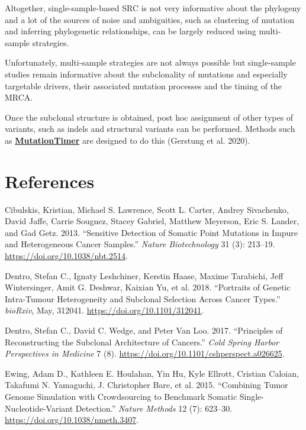 \documentclass[]{article}
\begin{document}
Altogether, single-sample-based SRC is not very informative about the
phylogeny and a lot of the sources of noise and ambiguities, such as
clustering of mutation and inferring phylogenetic relationships, can be
largely reduced using multi-sample strategies.

Unfortunately, multi-sample strategies are not always possible but
single-sample studies remain informative about the subclonality of
mutations and especially targetable drivers, their associated mutation
processes and the timing of the MRCA.

Once the subclonal structure is obtained, post hoc assignment of other
types of variants, such as indels and structural variants can be
performed. Methods such as
\href{https://github.com/gerstung-lab/MutationTimeR}{\textbf{MutationTimer}}
are designed to do this (Gerstung et al. 2020).

\newpage

\hypertarget{references}{%
\section*{References}\label{references}}

\hypertarget{refs}{}
\leavevmode\hypertarget{ref-cibulskis_sensitive_2013}{}%
Cibulskis, Kristian, Michael S. Lawrence, Scott L. Carter, Andrey
Sivachenko, David Jaffe, Carrie Sougnez, Stacey Gabriel, Matthew
Meyerson, Eric S. Lander, and Gad Getz. 2013. ``Sensitive Detection of
Somatic Point Mutations in Impure and Heterogeneous Cancer Samples.''
\emph{Nature Biotechnology} 31 (3): 213--19.
\url{https://doi.org/10.1038/nbt.2514}.

\leavevmode\hypertarget{ref-dentro_portraits_2018}{}%
Dentro, Stefan C., Ignaty Leshchiner, Kerstin Haase, Maxime Tarabichi,
Jeff Wintersinger, Amit G. Deshwar, Kaixian Yu, et al. 2018. ``Portraits
of Genetic Intra-Tumour Heterogeneity and Subclonal Selection Across
Cancer Types.'' \emph{bioRxiv}, May, 312041.
\url{https://doi.org/10.1101/312041}.

\leavevmode\hypertarget{ref-dentro_principles_2017}{}%
Dentro, Stefan C., David C. Wedge, and Peter Van Loo. 2017. ``Principles
of Reconstructing the Subclonal Architecture of Cancers.'' \emph{Cold
Spring Harbor Perspectives in Medicine} 7 (8).
\url{https://doi.org/10.1101/cshperspect.a026625}.

\leavevmode\hypertarget{ref-ewing_combining_2015}{}%
Ewing, Adam D., Kathleen E. Houlahan, Yin Hu, Kyle Ellrott, Cristian
Caloian, Takafumi N. Yamaguchi, J. Christopher Bare, et al. 2015.
``Combining Tumor Genome Simulation with Crowdsourcing to Benchmark
Somatic Single-Nucleotide-Variant Detection.'' \emph{Nature Methods} 12
(7): 623--30. \url{https://doi.org/10.1038/nmeth.3407}.
\end{document}
